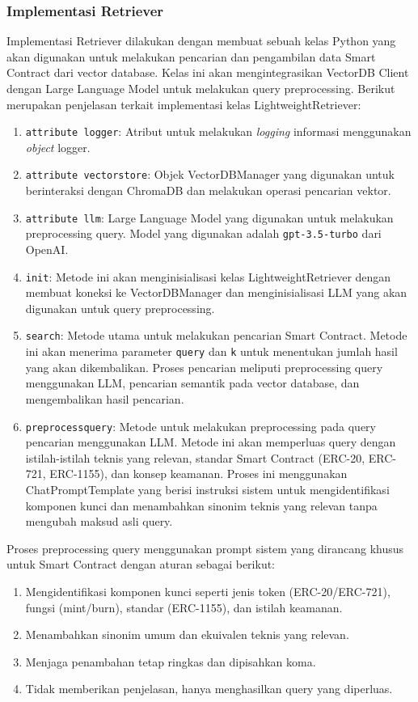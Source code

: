 \subsubsection{Implementasi Retriever}

Implementasi Retriever dilakukan dengan membuat sebuah kelas Python yang akan digunakan untuk melakukan pencarian dan pengambilan data Smart Contract dari vector database. Kelas ini akan mengintegrasikan VectorDB Client dengan Large Language Model untuk melakukan query preprocessing. Berikut merupakan penjelasan terkait implementasi kelas LightweightRetriever:

\begin{enumerate}
	\item \texttt{attribute logger}: Atribut untuk melakukan \textit{logging} informasi menggunakan \textit{object} logger.
	\item \texttt{attribute vector\textunderscore store}: Objek VectorDBManager yang digunakan untuk berinteraksi dengan ChromaDB dan melakukan operasi pencarian vektor.
	\item \texttt{attribute llm}: Large Language Model yang digunakan untuk melakukan preprocessing query. Model yang digunakan adalah \texttt{gpt-3.5-turbo} dari OpenAI.
	\item \texttt{\textunderscore\textunderscore init\textunderscore\textunderscore}: Metode ini akan menginisialisasi kelas LightweightRetriever dengan membuat koneksi ke VectorDBManager dan menginisialisasi LLM yang akan digunakan untuk query preprocessing.
	\item \texttt{search}: Metode utama untuk melakukan pencarian Smart Contract. Metode ini akan menerima parameter \texttt{query} dan \texttt{k} untuk menentukan jumlah hasil yang akan dikembalikan. Proses pencarian meliputi preprocessing query menggunakan LLM, pencarian semantik pada vector database, dan mengembalikan hasil pencarian.
	\item \texttt{preprocess\textunderscore query}: Metode untuk melakukan preprocessing pada query pencarian menggunakan LLM. Metode ini akan memperluas query dengan istilah-istilah teknis yang relevan, standar Smart Contract (ERC-20, ERC-721, ERC-1155), dan konsep keamanan. Proses ini menggunakan ChatPromptTemplate yang berisi instruksi sistem untuk mengidentifikasi komponen kunci dan menambahkan sinonim teknis yang relevan tanpa mengubah maksud asli query.
\end{enumerate}

Proses preprocessing query menggunakan prompt sistem yang dirancang khusus untuk Smart Contract dengan aturan sebagai berikut:
\begin{enumerate}
	\item Mengidentifikasi komponen kunci seperti jenis token (ERC-20/ERC-721), fungsi (mint/burn), standar (ERC-1155), dan istilah keamanan.
	\item Menambahkan sinonim umum dan ekuivalen teknis yang relevan.
	\item Menjaga penambahan tetap ringkas dan dipisahkan koma.
	\item Tidak memberikan penjelasan, hanya menghasilkan query yang diperluas.
\end{enumerate}

